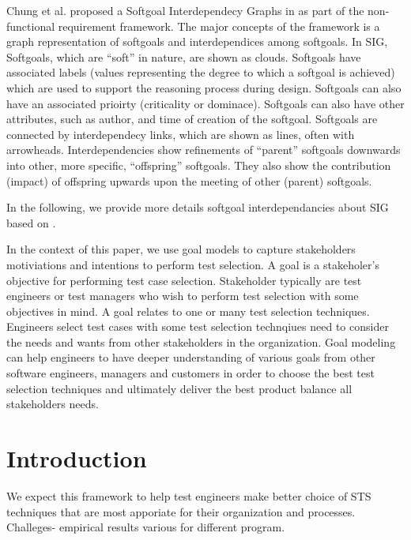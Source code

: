 Chung et al. proposed a Softgoal Interdependecy Graphs in \cite{NFR} as part of
the non-functional requirement framework. The major concepts of the framework is
a graph representation of softgoals and interdependices among softgoals.
In SIG, Softgoals, which are ``soft'' in nature, are shown as clouds. Softgoals have associated labels (values representing the degree to
which a softgoal is achieved) which are used to support the reasoning process
during design. Softgoals can also have an associated prioirty
(criticality or dominace). Softgoals can also have other attributes, such as
author, and time of creation of the softgoal.
Softgoals are connected by interdependecy links, which are shown as lines, often
with arrowheads. Interdependencies show refinements of ``parent'' softgoals downwards into other, more specific, ``offspring'' softgoals. They also show the contribution (impact) of offspring upwards upon the meeting of other (parent) softgoals.

In the following, we provide more details softgoal interdependancies about SIG
based on \cite{NFR}.



In the context of this paper, we use goal models to capture
stakeholders motiviations and intentions to perform test selection. A goal is a
stakeholer's objective for performing test case selection. Stakeholder typically are test engineers or test managers who wish to perform test selection with some objectives in mind. A goal relates to one or
many test selection techniques. 
Engineers select test cases with some test selection technqiues need to consider
the needs and wants from other stakeholders in the organization. Goal modeling
can help engineers to have deeper understanding of various goals from other
software engineers, managers and customers in order to choose the best test
selection techniques and ultimately deliver the best product balance all
stakeholders needs.











\chapter{Introduction}
We expect this framework to help test engineers make better choice of STS
techniques that are most apporiate for their organization and processes.
Challeges- empirical results various for different program.

